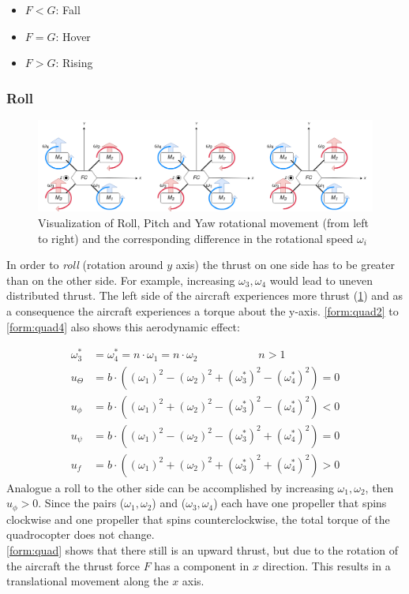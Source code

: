 \begin{itemize}
	\item $F < G$: Fall
	\item $F = G$: Hover
	\item $F > G$: Rising 
\end{itemize}

\newpage

\subsubsection{Roll}
\begin{figure}
	\centering
	\includegraphics[width=\linewidth]{figures/move.png}
	\caption{Visualization of Roll, Pitch and Yaw rotational movement (from left to right) and the corresponding difference in the rotational speed $\omega_i$}
	\label{fig:move}
\end{figure}
In order to \emph{roll} (rotation around $y$ axis) the thrust on one side has to be greater than on the other side. For example,
increasing $\omega_3, \omega_4$ would lead to uneven distributed thrust. 
The left side of the aircraft experiences more thrust (\cref{fig:move}) and as a consequence the aircraft experiences a torque about the y-axis.
\cref{form:quad2} to \cref{form:quad4} also shows this aerodynamic effect:

\begin{align*}
	\omega_3^* &= \omega_4^* = n \cdot \omega_1 = n \cdot \omega_2 \qquad \qquad \quad \enspace  n > 1\\
	u_{\Theta} &= b \cdot ((\omega_1)^2 - (\omega_2)^2 + (\omega_3^*)^2 - (\omega_4^*)^2) = 0\\
	u_{\phi} &= b \cdot ((\omega_1)^2 + (\omega_2)^2 - (\omega_3^*)^2 - (\omega_4^*)^2) < 0 \\
	u_{\psi} &= b \cdot ((\omega_1)^2 - (\omega_2)^2 - (\omega_3^*)^2 + (\omega_4^*)^2)	= 0 \\
	u_f &= b \cdot ((\omega_1)^2 + (\omega_2)^2 + (\omega_3^*)^2 + (\omega_4^*)^2) > 0 
\end{align*}
\newline
Analogue a roll to the other side can be accomplished by increasing $\omega_1, \omega_2$, then $u_{\phi} > 0$. 
Since the pairs ($\omega_1, \omega_2$) and ($\omega_3, \omega_4$) each have one propeller that spins clockwise and one propeller that spins counterclockwise, 
the total torque of the quadrocopter does not change.\\
\cref{form:quad} shows that there still is an upward thrust, but due to the rotation of the aircraft the thrust force $F$ has a component in $x$ direction. 
This results in a translational movement along the $x$ axis.

